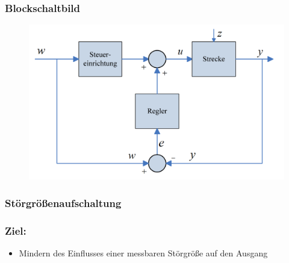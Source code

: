 \documentclass[10pt,a4paper]{article}
\begin{document}
\subsubsection*{Blockschaltbild}
\begin{figure}[H]
	\includegraphics[width=0.8\columnwidth]{imgs/abb1_8.png}
\end{figure}


\subsubsection{Störgrößenaufschaltung}
\subsubsection*{Ziel:}
\begin{itemize}
	\item Mindern des Einflusses einer messbaren Störgröße auf den Ausgang
\end{itemize}
\end{document}
